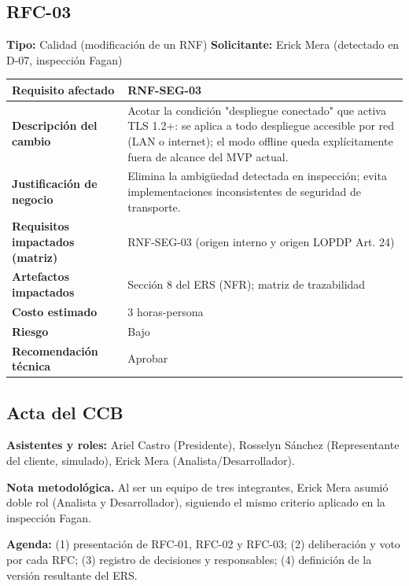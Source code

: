 \documentclass[11pt,a4paper]{article}
\begin{document}
\subsection{RFC-03}
\textbf{Tipo:} Calidad (modificación de un RNF) \quad \textbf{Solicitante:} Erick Mera (detectado en D-07, inspección Fagan)

\renewcommand{\arraystretch}{1.25}
\begin{tabularx}{\textwidth}{|>{\bfseries\RaggedRight\arraybackslash}p{4.6cm}|Y|}
\hline
Requisito afectado & RNF-SEG-03 \\ \hline
Descripción del cambio & Acotar la condición "despliegue conectado" que activa TLS 1.2+: se aplica a todo despliegue accesible por red (LAN o internet); el modo offline queda explícitamente fuera de alcance del MVP actual. \\ \hline
Justificación de negocio & Elimina la ambigüedad detectada en inspección; evita implementaciones inconsistentes de seguridad de transporte. \\ \hline
Requisitos impactados (matriz) & RNF-SEG-03 (origen interno y origen LOPDP Art. 24) \\ \hline
Artefactos impactados & Sección 8 del ERS (NFR); matriz de trazabilidad \\ \hline
Costo estimado & 3 horas-persona \\ \hline
Riesgo & Bajo \\ \hline
Recomendación técnica & Aprobar \\ \hline
\end{tabularx}

\subsection{Acta del CCB}
\textbf{Asistentes y roles:} Ariel Castro (Presidente), Rosselyn Sánchez (Representante del cliente, simulado), Erick Mera (Analista/Desarrollador).

\textbf{Nota metodológica.} Al ser un equipo de tres integrantes, Erick Mera asumió doble rol (Analista y Desarrollador), siguiendo el mismo criterio aplicado en la inspección Fagan.

\textbf{Agenda:} (1) presentación de RFC-01, RFC-02 y RFC-03; (2) deliberación y voto por cada RFC; (3) registro de decisiones y responsables; (4) definición de la versión resultante del ERS.
\end{document}
